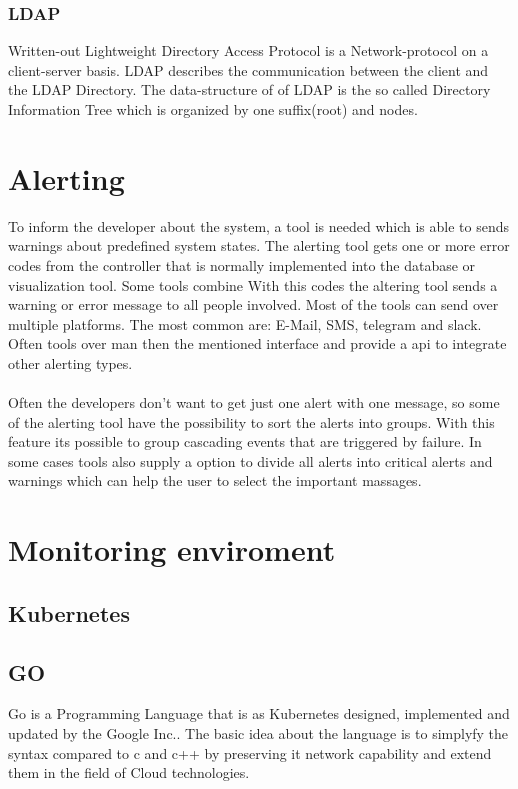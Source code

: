 \subsubsection{LDAP}
Written-out Lightweight Directory Access Protocol is a Network-protocol on a client-server basis. LDAP describes the communication between the client and the LDAP Directory. The data-structure of of LDAP is the so called Directory Information Tree which is organized by one suffix(root) and nodes.  
 


\section{Alerting}
To inform the developer about the system, a tool is needed which is able to sends warnings about predefined system states.
The alerting tool gets one or more error codes from the controller that is normally implemented into the database or visualization tool. Some tools combine With this codes the altering tool sends a warning or error message to all people involved. Most of the tools can send over multiple platforms. The most common are: E-Mail, SMS, telegram and slack. Often tools over man then the mentioned interface and provide a api to integrate other alerting types.\\
\\
Often the developers don’t want to get just one alert with one message, so some of the alerting tool have the possibility to sort the alerts into groups. With this feature its possible to group cascading events that are triggered by failure. In some cases tools also supply a option to divide all alerts into critical alerts and warnings which can help the user to select the important massages.  

\section{Monitoring enviroment}
\subsection{Kubernetes}

\subsection{GO}
Go is a Programming Language that is as Kubernetes designed, implemented and updated by the Google Inc.. The basic idea about the language is to simplyfy the syntax compared to c and c++ by preserving it network capability and extend them in the field of Cloud technologies.



